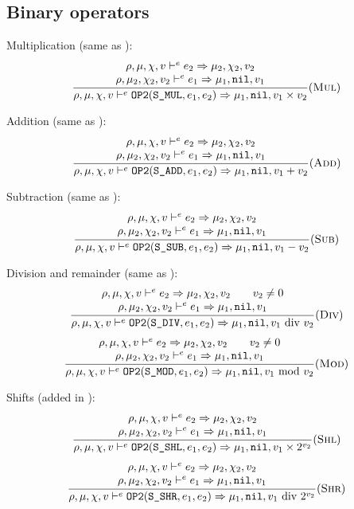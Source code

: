 \subsection{Binary operators}
Multiplication (same as \Cmm):
\[\dfrac{\begin{array}{c}
    \rho,\mu,\chi,v \vdash^e e_2\Rightarrow \mu_2,\chi_2,v_2 \\
    \rho,\mu_2,\chi_2,v_2 \vdash^e e_1\Rightarrow \mu_1,\texttt{nil},v_1
\end{array}}{\rho,\mu,\chi,v \vdash^e \texttt{OP2}(\texttt{S\_MUL}, e_1, e_2) \Rightarrow \mu_1,\texttt{nil},v_1\times v_2}(\textsc{Mul})\]

Addition (same as \Cmm):
\[\dfrac{\begin{array}{c}
    \rho,\mu,\chi,v \vdash^e e_2\Rightarrow \mu_2,\chi_2,v_2 \\
    \rho,\mu_2,\chi_2,v_2 \vdash^e e_1\Rightarrow \mu_1,\texttt{nil},v_1
\end{array}}{\rho,\mu,\chi,v \vdash^e \texttt{OP2}(\texttt{S\_ADD}, e_1, e_2) \Rightarrow \mu_1,\texttt{nil},v_1 + v_2}(\textsc{Add})\]

Subtraction (same as \Cmm):
\[\dfrac{\begin{array}{c}
    \rho,\mu,\chi,v \vdash^e e_2\Rightarrow \mu_2,\chi_2,v_2 \\
    \rho,\mu_2,\chi_2,v_2 \vdash^e e_1\Rightarrow \mu_1,\texttt{nil},v_1
\end{array}}{\rho,\mu,\chi,v \vdash^e \texttt{OP2}(\texttt{S\_SUB}, e_1, e_2) \Rightarrow \mu_1,\texttt{nil},v_1 - v_2}(\textsc{Sub})\]

Division and remainder (same as \Cmm):
\[\dfrac{\begin{array}{c}
    \rho,\mu,\chi,v \vdash^e e_2\Rightarrow \mu_2,\chi_2,v_2 \qquad v_2\ne 0\\
    \rho,\mu_2,\chi_2,v_2 \vdash^e e_1\Rightarrow \mu_1,\texttt{nil},v_1
\end{array}}{\rho,\mu,\chi,v \vdash^e \texttt{OP2}(\texttt{S\_DIV}, e_1, e_2) \Rightarrow \mu_1,\texttt{nil},v_1\text{ div } v_2}(\textsc{Div})\]
\[\dfrac{\begin{array}{c}
    \rho,\mu,\chi,v \vdash^e e_2\Rightarrow \mu_2,\chi_2,v_2 \qquad v_2\ne 0\\
    \rho,\mu_2,\chi_2,v_2 \vdash^e e_1\Rightarrow \mu_1,\texttt{nil},v_1
\end{array}}{\rho,\mu,\chi,v \vdash^e \texttt{OP2}(\texttt{S\_MOD}, e_1, e_2) \Rightarrow \mu_1,\texttt{nil},v_1\text{ mod } v_2}(\textsc{Mod})\]

Shifts (added in \Cmp):
\[\dfrac{\begin{array}{c}
    \rho,\mu,\chi,v \vdash^e e_2\Rightarrow \mu_2,\chi_2,v_2 \\
    \rho,\mu_2,\chi_2,v_2 \vdash^e e_1\Rightarrow \mu_1,\texttt{nil},v_1
\end{array}}{\rho,\mu,\chi,v \vdash^e \texttt{OP2}(\texttt{S\_SHL}, e_1, e_2) \Rightarrow \mu_1,\texttt{nil},v_1\times 2^{v_2}}(\textsc{Shl})\]
\[\dfrac{\begin{array}{c}
    \rho,\mu,\chi,v \vdash^e e_2\Rightarrow \mu_2,\chi_2,v_2 \\
    \rho,\mu_2,\chi_2,v_2 \vdash^e e_1\Rightarrow \mu_1,\texttt{nil},v_1
\end{array}}{\rho,\mu,\chi,v \vdash^e \texttt{OP2}(\texttt{S\_SHR}, e_1, e_2) \Rightarrow \mu_1,\texttt{nil},v_1\text{ div } 2^{v_2}} (\textsc{Shr})\]

